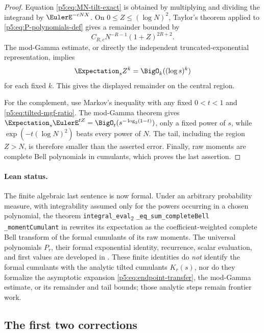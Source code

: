 \documentclass[11pt]{article}
\numberwithin{equation}{section}
\theoremstyle{definition}
\theoremstyle{remark}
\begin{document}
\begin{proof}
Equation \cref{p5:eq:MN-tilt-exact} is obtained by multiplying and dividing the
integrand by $\EulerE^{-cNX}$.  On $0\le Z\le(\log N)^2$, Taylor's theorem applied
to \cref{p5:eq:P-polynomials-def} gives a remainder bounded by
\[
 C_{R,c}N^{-R-1}(1+Z)^{2R+2}.
\]
The mod-Gamma estimate, or directly the independent truncated-exponential
representation, implies
\begin{equation}\label{p5:eq:tilted-moment-bound}
 \Expectation_sZ^k=\BigO_k((\log s)^k)
\end{equation}
for each fixed $k$.  This gives the displayed remainder on the central region.

For the complement, use Markov's inequality with any fixed $0<t<1$ and
\cref{p5:eq:tilted-mgf-ratio}.  The mod-Gamma theorem gives
$\Expectation_s\EulerE^{tZ}=\BigO_t(s^{-\log_2(1-t)})$, only a fixed power of $s$, while
$\exp(-t(\log N)^2)$ beats every power of $N$.  The tail, including the region
$Z>N$, is therefore smaller than the asserted error.  Finally, raw moments are
complete Bell polynomials in cumulants, which proves the last assertion.
\end{proof}

\paragraph{Lean status.}
The finite algebraic last sentence is now formal.  Under an arbitrary
probability measure, with integrability assumed only for the powers occurring
in a chosen polynomial, the theorem
\texttt{integral\_eval}\textsubscript{2}\allowbreak
\texttt{\_eq\_sum\_completeBell}\allowbreak
\texttt{\_momentCumulant} in
 rewrites its expectation as the
coefficient-weighted complete Bell transform of the formal cumulants of its
raw moments.  The universal polynomials \(P_r\), their formal exponential
identity, recurrence, scalar evaluation, and first values are developed in
.  These finite identities do
\emph{not} identify the formal cumulants with the analytic tilted cumulants
\(K_r(s)\), nor do they formalize the asymptotic expansion
\eqref{p5:eq:endpoint-transfer}, the mod-Gamma estimate, or its remainder and
tail bounds; those analytic steps remain frontier work.

\subsection{The first two corrections}
\end{document}
